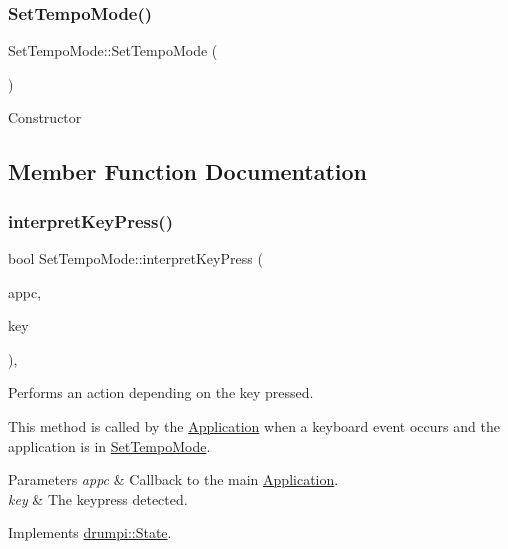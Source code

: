 \subsubsection{\texorpdfstring{Set\+Tempo\+Mode()}{SetTempoMode()}}
{\footnotesize\ttfamily Set\+Tempo\+Mode\+::\+Set\+Tempo\+Mode (\begin{DoxyParamCaption}{ }\end{DoxyParamCaption})}

Constructor 

\subsection{Member Function Documentation}
\mbox{\label{classdrumpi_1_1SetTempoMode_a659f307caf23a57e3319ff6c510d41bf}} 
\subsubsection{\texorpdfstring{interpret\+Key\+Press()}{interpretKeyPress()}}
{\footnotesize\ttfamily bool Set\+Tempo\+Mode\+::interpret\+Key\+Press (\begin{DoxyParamCaption}\item[{\hyperlink{classdrumpi_1_1ApplicationCallback}{Application\+Callback} $\ast$}]{appc,  }\item[{int}]{key }\end{DoxyParamCaption})\hspace{0.3cm}{\ttfamily [override]}, {\ttfamily [virtual]}}



Performs an action depending on the key pressed. 

This method is called by the \hyperlink{classdrumpi_1_1Application}{Application} when a keyboard event occurs and the application is in \hyperlink{classdrumpi_1_1SetTempoMode}{Set\+Tempo\+Mode}. 
\begin{DoxyParams}{Parameters}
{\em appc} & Callback to the main \hyperlink{classdrumpi_1_1Application}{Application}. \\
\hline
{\em key} & The keypress detected. \\
\hline
\end{DoxyParams}


Implements \hyperlink{classdrumpi_1_1State_aaa6205d85513b3f717c126e0717e1dbd}{drumpi\+::\+State}.

